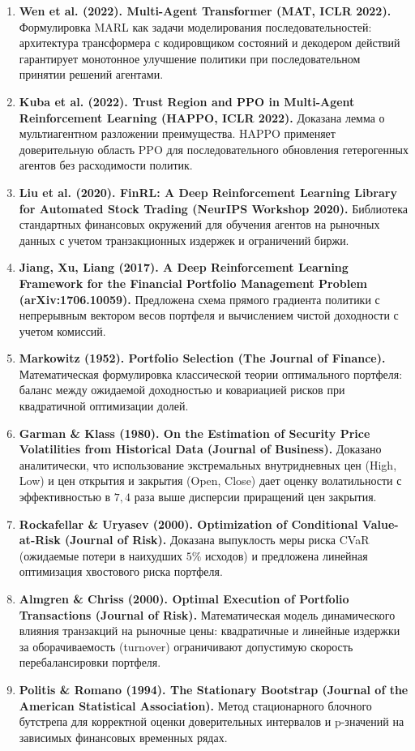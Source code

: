 \documentclass[11pt,a4paper]{article}
\begin{document}
\begin{enumerate}[leftmargin=*]
\item \textbf{Wen et al. (2022). Multi-Agent Transformer (MAT, ICLR 2022).} Формулировка MARL как задачи моделирования последовательностей: архитектура трансформера с кодировщиком состояний и декодером действий гарантирует монотонное улучшение политики при последовательном принятии решений агентами.

\item \textbf{Kuba et al. (2022). Trust Region and PPO in Multi-Agent Reinforcement Learning (HAPPO, ICLR 2022).} Доказана лемма о мультиагентном разложении преимущества. HAPPO применяет доверительную область PPO для последовательного обновления гетерогенных агентов без расходимости политик.

\item \textbf{Liu et al. (2020). FinRL: A Deep Reinforcement Learning Library for Automated Stock Trading (NeurIPS Workshop 2020).} Библиотека стандартных финансовых окружений для обучения агентов на рыночных данных с учетом транзакционных издержек и ограничений биржи.

\item \textbf{Jiang, Xu, Liang (2017). A Deep Reinforcement Learning Framework for the Financial Portfolio Management Problem (arXiv:1706.10059).} Предложена схема прямого градиента политики с непрерывным вектором весов портфеля и вычислением чистой доходности с учетом комиссий.

\item \textbf{Markowitz (1952). Portfolio Selection (The Journal of Finance).} Математическая формулировка классической теории оптимального портфеля: баланс между ожидаемой доходностью и ковариацией рисков при квадратичной оптимизации долей.

\item \textbf{Garman \& Klass (1980). On the Estimation of Security Price Volatilities from Historical Data (Journal of Business).} Доказано аналитически, что использование экстремальных внутридневных цен (High, Low) и цен открытия и закрытия (Open, Close) дает оценку волатильности с эффективностью в $7{,}4$ раза выше дисперсии приращений цен закрытия.

\item \textbf{Rockafellar \& Uryasev (2000). Optimization of Conditional Value-at-Risk (Journal of Risk).} Доказана выпуклость меры риска CVaR (ожидаемые потери в наихудших $5\%$ исходов) и предложена линейная оптимизация хвостового риска портфеля.

\item \textbf{Almgren \& Chriss (2000). Optimal Execution of Portfolio Transactions (Journal of Risk).} Математическая модель динамического влияния транзакций на рыночные цены: квадратичные и линейные издержки за оборачиваемость (turnover) ограничивают допустимую скорость перебалансировки портфеля.

\item \textbf{Politis \& Romano (1994). The Stationary Bootstrap (Journal of the American Statistical Association).} Метод стационарного блочного бутстрепа для корректной оценки доверительных интервалов и p-значений на зависимых финансовых временных рядах.
\end{enumerate}
\end{document}
